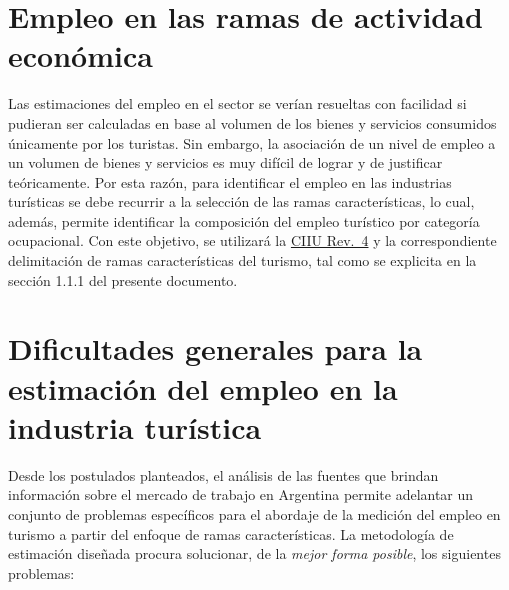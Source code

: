 \documentclass[
  openany]{book}
\begin{document}
\hypertarget{empleo-en-las-ramas-de-actividad-econuxf3mica}{%
\section{Empleo en las ramas de actividad económica}\label{empleo-en-las-ramas-de-actividad-econuxf3mica}}

Las estimaciones del empleo en el sector se verían resueltas con facilidad si pudieran ser calculadas en base al volumen de los bienes y servicios consumidos únicamente por los turistas. Sin embargo, la asociación de un nivel de empleo a un volumen de bienes y servicios es muy difícil de lograr y de justificar teóricamente. Por esta razón, para identificar el empleo en las industrias turísticas se debe recurrir a la selección de las ramas características, lo cual, además, permite identificar la composición del empleo turístico por categoría ocupacional.
Con este objetivo, se utilizará la \href{https://unstats.un.org/unsd/publication/seriesm/seriesm_4rev4s.pdf}{CIIU Rev.~4} y la correspondiente delimitación de ramas características del turismo, tal como se explicita en la sección 1.1.1 del presente documento.

\hypertarget{dificultades-generales-para-la-estimaciuxf3n-del-empleo-en-la-industria-turuxedstica}{%
\section{Dificultades generales para la estimación del empleo en la industria turística}\label{dificultades-generales-para-la-estimaciuxf3n-del-empleo-en-la-industria-turuxedstica}}

Desde los postulados planteados, el análisis de las fuentes que brindan información sobre el mercado de trabajo en Argentina permite adelantar un conjunto de problemas específicos para el abordaje de la medición del empleo en turismo a partir del enfoque de ramas características. La metodología de estimación diseñada procura solucionar, de la \emph{mejor forma posible}, los siguientes problemas:
\end{document}
